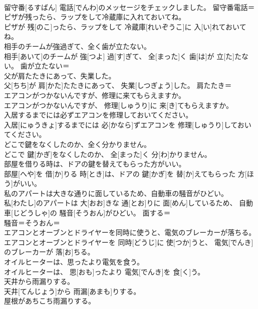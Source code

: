 \documentclass[8pt]{extreport}
\begin{document}
\begin{CJK}{UTF8}{min}
\\	留守番[るすばん] 電話[でんわ]のメッセージをチェックしました。	留守番電話＝ 
\\	ピザが残ったら、ラップをして冷蔵庫に入れておいてね。	
\\	ピザが 残[のこ]ったら、ラップをして 冷蔵庫[れいぞうこ]に 入[い]れておいてね。	
\\	相手のチームが強過ぎて、全く歯が立たない。	
\\	相手[あいて]のチームが 強[つよ] 過[す]ぎて、 全[まった]く 歯[は]が 立[た]たない。	歯が立たない＝ 
\\	父が肩たたきにあって、失業した。	
\\	父[ちち]が 肩[かた]たたきにあって、 失業[しつぎょう]した。	肩たたき＝ 
\\	エアコンがつかないんですが、修理に来てもらえますか。	
\\	エアコンがつかないんですが、 修理[しゅうり]に 来[き]てもらえますか。	
\\	入居するまでには必ずエアコンを修理しておいてください。	
\\	入居[にゅうきょ]するまでには 必[かなら]ずエアコンを 修理[しゅうり]しておいてください。	
\\	どこで鍵をなくしたのか、全く分かりません。	
\\	どこで 鍵[かぎ]をなくしたのか、 全[まった]く 分[わ]かりません。	
\\	部屋を借りる時は、ドアの鍵を替えてもらった方がいい。	
\\	部屋[へや]を 借[か]りる 時[とき]は、ドアの 鍵[かぎ]を 替[か]えてもらった 方[ほう]がいい。	
\\	私のアパートは大きな通りに面しているため、自動車の騒音がひどい。	
\\	私[わたし]のアパートは 大[おお]きな 通[とお]りに 面[めん]しているため、 自動車[じどうしゃ]の 騒音[そうおん]がひどい。	面する＝ 
\\	騒音＝そうおん＝ 
\\	エアコンとオーブンとドライヤーを同時に使うと、電気のブレーカーが落ちる。	
\\	エアコンとオーブンとドライヤーを 同時[どうじ]に 使[つか]うと、 電気[でんき]のブレーカーが 落[お]ちる。	
\\	オイルヒーターは、思ったより電気を食う。	
\\	オイルヒーターは、 思[おも]ったより 電気[でんき]を 食[く]う。	
\\	天井から雨漏りする。	
\\	天井[てんじょう]から 雨漏[あまも]りする。	
\\	屋根があちこち雨漏りする。	

\end{CJK}
\end{document}
